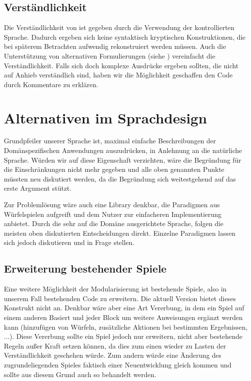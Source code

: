 \subsection{Verständlichkeit} %
\label{sub:verstandlichkeit}
	Die Verständlichkeit von \dg ist gegeben durch die Verwendung der kontrollierten Sprache. Dadurch ergeben sich keine syntaktisch kryptischen Konstruktionen, die bei späterem Betrachten aufwendig rekonstruiert werden müssen. Auch die Unterstützung von alternativen Formulierungen (siehe ) vereinfacht die Verständlichkeit. Falls sich doch komplexe Ausdrücke ergeben sollten, die nicht auf Anhieb verständlich sind, haben wir die Möglichkeit geschaffen den Code durch Kommentare zu erklären.


\section{Alternativen im Sprachdesign} %
\label{sec:alternativen_im_sprachdesign} 

Grundpfeiler unserer Sprache ist, maximal einfache Beschreibungen der Domänspezifischen Anwendungen auszudrücken, in Anlehnung an die natürliche Sprache. Würden wir auf diese Eigenschaft verzichten, wäre die Begründung für die Einschränkungen nicht mehr gegeben und alle oben genannten Punkte müssten neu diskutiert werden, da die Begründung sich weitestgehend auf das erste Argument stützt. 

Zur Problemlösung wäre auch eine Library denkbar, die Paradigmen aus Würfelspielen aufgreift und dem Nutzer zur einfacheren Implementierung anbietet. Durch die sehr auf die Domäne ausgerichtete Sprache, folgen die meisten oben diskutierten Entscheidungen direkt. Einzelne Paradigmen lassen sich jedoch diskutieren und in Frage stellen.

\subsection{Erweiterung bestehender Spiele}
\label{subsub:erweiterung_bestehender_spiele}
	Eine weitere Möglichkeit der Modularisierung ist bestehende Spiele, also in unserem Fall bestehenden Code zu erweitern. Die aktuell \dg Version bietet dieses Konstrukt nicht an. Denkbar wäre aber eine Art Vererbung, in dem ein Spiel auf einem anderen Basiert und jeder Block um weitere Anweisungen ergänzt werden kann (hinzufügen von Würfeln, zusätzliche Aktionen bei bestimmten Ergebnissen, ...). Diese Vererbung sollte ein Spiel jedoch nur erweitern, nicht aber bestehende Regeln außer Kraft setzen können, da dies zum einen wieder zu Lasten der Verständlichkeit geschehen würde. Zum andern würde eine Änderung des zugrundeliegenden Spieles faktisch einer Neuentwicklung gleich kommen und sollte aus diesem Grund auch so behandelt werden.

